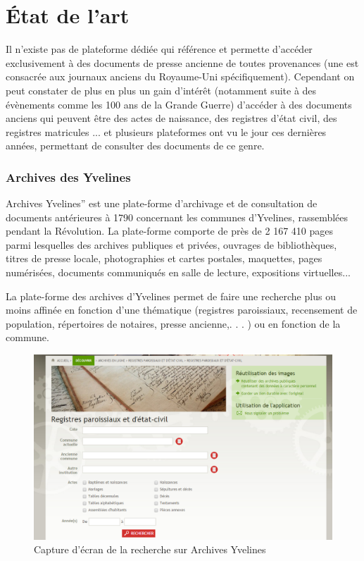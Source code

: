 \section{État de l'art}
\label{sec:etat_art}
    Il n’existe pas de plateforme dédiée qui référence et permette d’accéder exclusivement à des documents de presse ancienne de toutes
    provenances (une est consacrée aux journaux anciens du Royaume-Uni spécifiquement). Cependant
    on peut constater de plus en plus un gain d’intérêt (notamment suite à des évènements comme les 100 ans de la Grande Guerre)
    d’accéder à des documents anciens qui peuvent être des actes de naissance, des registres d’état civil, des registres matricules ...
    et plusieurs plateformes ont vu le jour ces dernières années, permettant de consulter des documents de ce genre.


        \subsubsection{Archives des Yvelines}
        \label{subsubsec:yvelines}
        Archives Yvelines” est une plate-forme d’archivage et de consultation de documents antérieures à 1790
        concernant les communes d’Yvelines, rassemblées pendant la Révolution. La plate-forme comporte de près
        de 2 167 410 pages parmi lesquelles des archives publiques et privées, ouvrages de bibliothèques, titres de presse locale,
        photographies et cartes postales, maquettes, pages numérisées, documents communiqués en salle de lecture, expositions virtuelles...

        La plate-forme des archives d’Yvelines permet de faire une recherche plus ou moins affinée en fonction d’une thématique
        (registres paroissiaux, recensement de population, répertoires de notaires, presse ancienne,. . . ) ou en fonction de la commune.

        \begin{figure}[ht!]
            \centering
            \includegraphics[width=1\textwidth]{figure/screen_yvelines_recherche.png}
            \caption{Capture d'écran de la recherche sur Archives Yvelines}
            \label{fig:yvelines_recherche}
        \end{figure}

